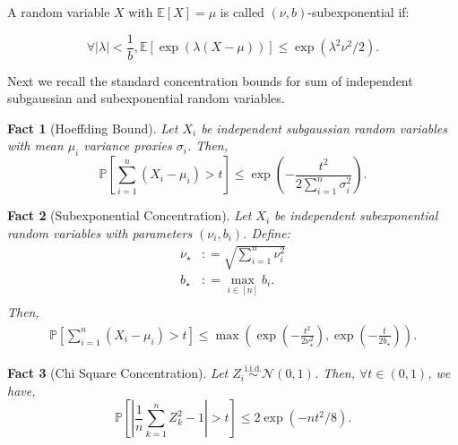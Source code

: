 \documentclass[final,12pt]{colt2018} %
\newcommand{\E}{\mathbb{E}}
\newcommand{\Prob}{\mathbb{P}}
\newcommand{\iid}{\stackrel{\text{i.i.d.}}{\sim}}
\newcommand{\gauss}[2]{\mathcal{N}\left( #1,#2 \right)}
\newtheorem{fact}{Fact}
\begin{document}
\begin{definition} A random variable $X$ with $\E[X] = \mu $ is called $(\nu,b)$-subexponential if:

$$\forall |\lambda| < \frac{1}{b}, \E[\exp(\lambda(X-\mu))] \leq \exp(\lambda^2 \nu^2/2).$$
\label{def: subexp_def}
\end{definition}
Next we recall the standard concentration bounds for sum of independent subgaussian and subexponential random variables. 

\begin{fact}[Hoeffding Bound] Let $X_i$ be independent subgaussian random variables with mean $\mu_i$ variance proxies $\sigma_i$. Then,
$$\Prob \left[ \sum_{i=1}^n (X_i - \mu_i) > t\right]\leq  \exp \left( - \frac{t^2}{2\sum_{i=1}^n \sigma_i^2} \right).$$
\label{fact: subgauss_concentration}
\end{fact}

\begin{fact}[Subexponential Concentration]
\label{fact: subexp_concentration} Let $X_i$ be independent subexponential random variables with parameters $(\nu_i,b_i)$. Define:
\begin{align*}
    \nu_\star &: = \sqrt{\sum_{i=1}^n \nu_i^2} \\
    b_\star & : = \max_{i \in [n]} b_i. \\
\end{align*}
Then,
\begin{align*}
\Prob \left[ \sum_{i=1}^n (X_i - \mu_i) > t\right]\leq \max \left(\exp\left(-\frac{t^2}{2\nu_\star^2}\right) ,\exp\left(-\frac{t}{2b_\star}\right)\right).  
\end{align*}
\end{fact}
\begin{fact}[Chi Square Concentration]
\label{fact: chisq_concentration} Let $Z_i \iid \gauss{0}{1}$. Then, $\forall t \in (0,1)$, we have,
$$\Prob \left[ \left| \frac{1}{n} \sum_{k=1}^n Z_k^2 - 1 \right| > t \right] \leq 2 \exp(-n t^2/8).$$
\end{fact}
\end{document}
